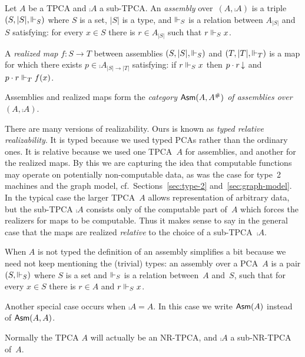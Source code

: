 \begin{definition}[Assemblies]
  Let $A$ be a TPCA and $\comp{A}$ a sub-TPCA. An \emph{assembly}
  over~$(A, \comp{A})$ is a triple $(S, |S|, {\Vdash_S})$ where $S$ is a
  set, $|S|$ is a type, and $\Vdash_S$ is a relation between $A_{|S|}$
  and~$S$ satisfying: for every $x \in S$ there is $r \in A_{|S|}$
  such that $r \Vdash_S x$.

  A \emph{realized map} $f : S \to T$ between assemblies $(S, |S|,
  {\Vdash_S})$ and $(T, |T|, {\Vdash_T})$ is a map for which there exists $p
  \in \comp{A}_{|S| \to |T|}$ satisfying: if $r \Vdash_S x$ then $p
    \cdot r\,{\downarrow}$ and $p \cdot r \Vdash_T f(x)$.

  Assemblies and realized maps form the \emph{category
    $\mathsf{Asm}(A,A^{\#})$ of assemblies over $(A, \comp{A})$}.
\end{definition}

\noindent
There are many versions of realizability. Ours is known as \emph{typed
  relative realizability}. It is typed because we used typed PCAs
rather than the ordinary ones. It is relative because we used one
TPCA~$A$ for assemblies, and another for the realized maps. By this we
are capturing the idea that computable functions may operate on
potentially non-computable data, as was the case for type~2 machines
and the graph model, cf.\ Sections~\ref{sec:type-2}
and~\ref{sec:graph-model}. In the typical case the larger TPCA~$A$
allows representation of arbitrary data, but the sub-TPCA $\comp{A}$
consists only of the computable part of~$A$ which forces the realizers
for maps to be computable. Thus it makes sense to say in the general
case that the maps are realized \emph{relative} to the choice of a
sub-TPCA~$\comp{A}$.

When $A$ is not typed the definition of an assembly simplifies a bit
because we need not keep mentioning the (trivial) types: an assembly
over a PCA~$A$ is a pair $(S, {\Vdash_S})$ where $S$ is a set and $\Vdash_S$
is a relation between~$A$ and~$S$, such that for every $x \in S$ there
is $r \in A$ and $r \Vdash_S x$.

Another special case occurs when $\comp{A} = A$. In this case we write
$\mathsf{Asm}(A)$ instead of $\mathsf{Asm}(A,A)$.

Normally the TPCA $A$ will actually be an NR-TPCA, and $\comp{A}$ a
sub-NR-TPCA of~$A$.

